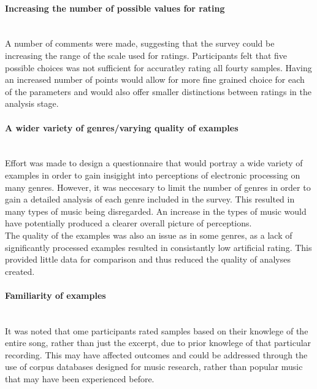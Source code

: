 \documentclass[titlepage]{scrartcl}
\begin{document}
    \paragraph{Increasing the number of possible values for rating}\mbox{}\\
    A number of comments were made, suggesting that the survey could be
    increasing the range of the scale used for ratings. Participants felt that
    five possible choices was not sufficient for accuratley rating all fourty
    samples. Having an increased number of points would allow for more fine
    grained choice for each of the parameters and would also offer smaller
    distinctions between ratings in the analysis stage. 

    \paragraph{A wider variety of genres/varying quality of examples}\mbox{}\\
    Effort was made to design a questionnaire that would portray a wide variety
    of examples in order to gain insigight into perceptions of electronic
    processing on many genres. However, it was neccesary to limit the number of
    genres in order to gain a detailed analysis of each genre included in the
    survey. This resulted in many types of music being disregarded. An increase
    in the types of music would have potentially produced a clearer overall
    picture of perceptions.\\ 
    The quality of the examples was also an issue as in some genres, as a lack
    of significantly processed examples resulted in consistantly low artificial
    rating. This provided little data for comparison and thus reduced the
    quality of analyses created.

    \paragraph{Familiarity of examples}\mbox{}\\
    It was noted that ome participants rated samples based on their knowlege of
    the entire song, rather than just the excerpt, due to prior knowlege of
    that particular recording. This may have affected outcomes and could be
    addressed through the use of corpus databases designed for music research,
    rather than popular music that may have been experienced before.
\end{document}
